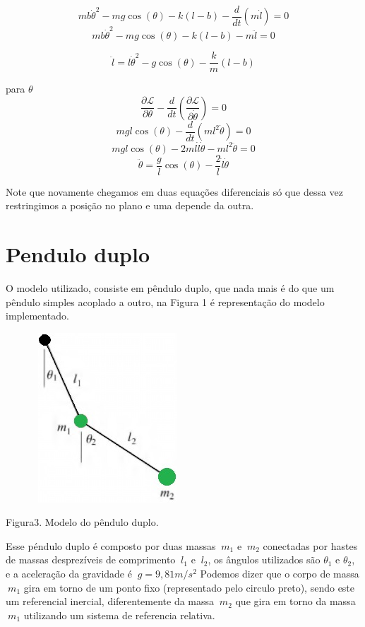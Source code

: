 \documentclass[a4paper]{article} %
\begin{document}
\[mb\dot{\theta}^2 -mg\cos(\theta) -k(l-b) -\frac{d}{dt}(m\dot{l}) = 0\]
\[mb\dot{\theta}^2 -mg\cos(\theta) -k(l-b) -m\ddot{l} = 0\]

\begin{equation}
	\ddot{l} = l\dot{\theta}^2 -g\cos(\theta) -\frac{k}{m}(l-b)
\end{equation}


para $\theta$
\[\frac{\partial \mathcal{L}}{\partial \theta} - \frac{d}{dt}\left(\frac{\partial \mathcal{L}}{\partial \dot{\theta}}\right) = 0\]
\[mgl\cos(\theta) -\frac{d}{dt}(ml^2\dot{\theta}) = 0\]
\[mgl\cos(\theta) -2ml\dot{l}\dot{\theta} - ml^2\ddot{\theta} = 0\]
\begin{equation}
	\ddot{\theta} =  \frac{g}{l}\cos(\theta) - \frac{2}{l}\dot{l}\dot{\theta}
\end{equation}

Note que novamente chegamos em duas equações diferenciais só que dessa vez restringimos a posição no plano e uma depende da outra.

\section{Pendulo duplo}

O modelo utilizado, consiste em p\^{e}ndulo duplo, que nada mais \'{e} do que um p\^{e}ndulo simples acoplado a outro, na Figura 1 \'{e} representa\c{c}\~{a}o do modelo implementado.

\begin{center}
	\includegraphics[width=3.00in, height=2.50in, keepaspectratio=false]{Fimage5.jpg}
	
	\scriptsize {Figura3. Modelo do p\^{e}ndulo duplo.}
\end{center}


Esse p\'{e}ndulo duplo \'{e} composto por duas massas $\ m_1 $ e $\ m_2$ conectadas por hastes de massas desprez\'{i}veis de comprimento $\ l_1$ e $\ l_2$, os \^{a}ngulos utilizados s\~{a}o $\theta_1$ e $\theta_2$, e a acelera\c{c}\~{a}o da gravidade \'{e} $\ g = 9,81 m/s^2$
Podemos dizer que o corpo de massa $\ m_1$ gira em torno de um ponto fixo (representado pelo circulo preto), sendo este um referencial inercial, diferentemente da massa $\ m_2$ que gira em torno da massa $\ m_1$ utilizando um sistema de referencia relativa.
\end{document}
